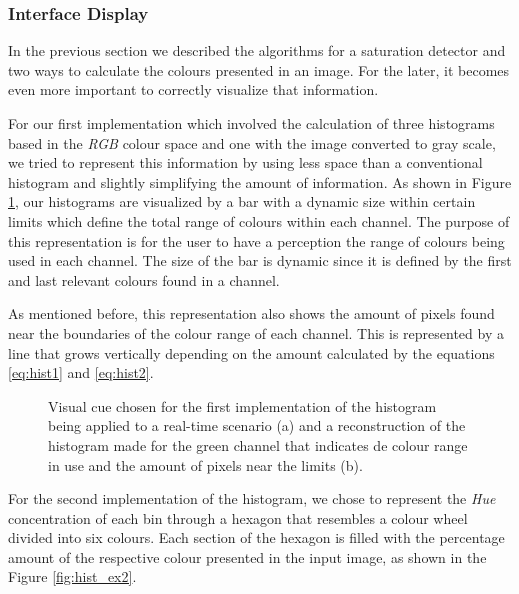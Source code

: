 \subsubsection{Interface Display}
In the previous section we described the algorithms for a saturation detector and two ways to calculate the colours presented in an image. For the later, it becomes even more important to correctly visualize that information.

For our first implementation which involved the calculation of three histograms based in the \emph{RGB} colour space and one with the image converted to gray scale, we tried to represent this information by using less space than a conventional histogram and slightly simplifying the amount of information. As shown in Figure \ref{fig:hist_ex1}, our histograms are visualized by a bar with a dynamic size within certain limits which define the total range of colours within each channel. The purpose of this representation is for the user to have a perception the range of colours being used in each channel. The size of the bar is dynamic since it is defined by the first and last relevant colours found in a channel.

As mentioned before, this representation also shows the amount of pixels found near the boundaries of the colour range of each channel. This is represented by a line that grows vertically depending on the amount calculated by the equations \ref{eq:hist1} and \ref{eq:hist2}.

\begin{figure}[htb]
	\centering
  \caption{Visual cue chosen for the first implementation of the histogram being applied to a real-time scenario (a) and a reconstruction of the histogram made for the green channel that indicates de colour range in use and the amount of pixels near the limits (b).}
	\label{fig:hist_ex1}
\end{figure}

For the second implementation of the histogram, we chose to represent the \emph{Hue} concentration of each bin through a hexagon that resembles a colour wheel divided into six colours. Each section of the hexagon is filled with the percentage amount of the respective colour presented in the input image, as shown in the Figure \ref{fig:hist_ex2}.

